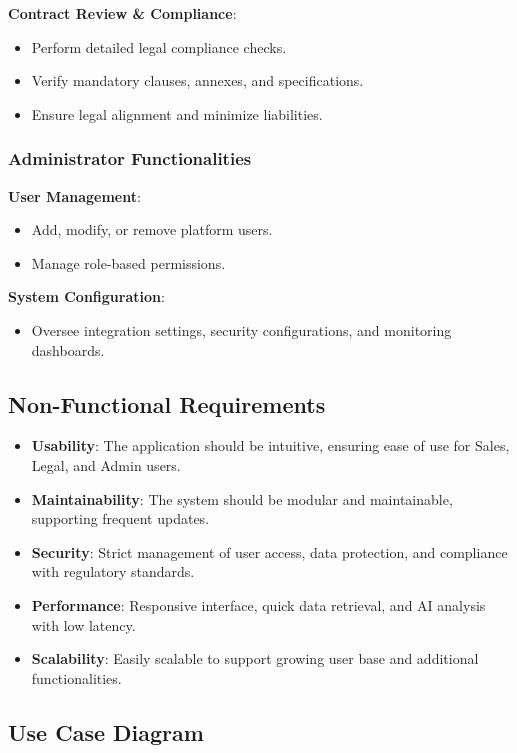 \textbf{Contract Review \& Compliance}:
\begin{itemize}
    \item Perform detailed legal compliance checks.
    \item Verify mandatory clauses, annexes, and specifications.
    \item Ensure legal alignment and minimize liabilities.
\end{itemize}

\subsubsection{Administrator Functionalities}
\textbf{User Management}:
\begin{itemize}
    \item Add, modify, or remove platform users.
    \item Manage role-based permissions.
\end{itemize}

\textbf{System Configuration}:
\begin{itemize}
    \item Oversee integration settings, security configurations, and monitoring dashboards.
\end{itemize}

\subsection{Non-Functional Requirements}
\begin{itemize}
    \item \textbf{Usability}: The application should be intuitive, ensuring ease of use for Sales, Legal, and Admin users.
    \item \textbf{Maintainability}: The system should be modular and maintainable, supporting frequent updates.
    \item \textbf{Security}: Strict management of user access, data protection, and compliance with regulatory standards.
    \item \textbf{Performance}: Responsive interface, quick data retrieval, and AI analysis with low latency.
    \item \textbf{Scalability}: Easily scalable to support growing user base and additional functionalities.
\end{itemize}

\subsection{Use Case Diagram}

